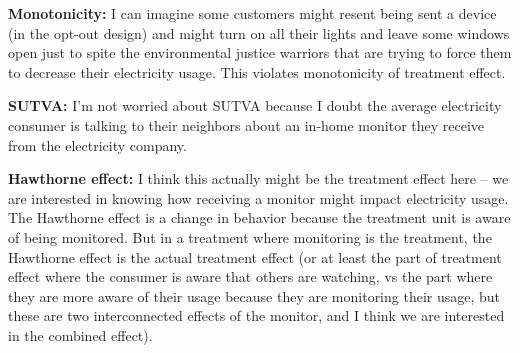 \documentclass[12pt]{article}
\begin{document}
\newpage
{}

\textbf{Monotonicity:} I can imagine some customers might resent being sent a device (in the opt-out design) and might turn on all their lights and leave some windows open just to spite the environmental justice warriors that are trying to force them to decrease their electricity usage. This violates monotonicity of treatment effect.

\textbf{SUTVA:} I'm not worried about SUTVA because I doubt the average electricity consumer is talking to their neighbors about an in-home monitor they receive from the electricity company.

\textbf{Hawthorne effect:} I think this actually might be the treatment effect here -- we are interested in knowing how receiving a monitor might impact electricity usage. The Hawthorne effect is a change in behavior because the treatment unit is aware of being monitored. But in a treatment where monitoring is the treatment, the Hawthorne effect is the actual treatment effect (or at least the part of treatment effect where the consumer is aware that others are watching, vs the part where they are more aware of their usage because they are monitoring their usage, but these are two interconnected effects of the monitor, and I think we are interested in the combined effect).





\newpage
\end{document}
